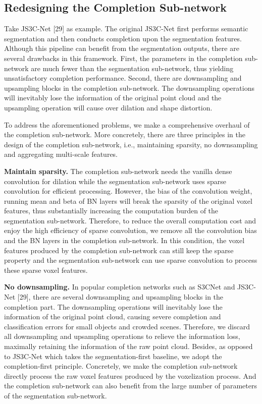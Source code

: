 \documentclass[10pt,twocolumn,letterpaper]{article}
\begin{document}
\subsection{Redesigning the Completion Sub-network}

Take JS3C-Net [29] as example. The original JS3C-Net first performs semantic segmentation and then conducts completion upon the segmentation features. Although this pipeline can benefit from the segmentation outputs, there are several drawbacks in this framework. First, the parameters in the completion sub-network are much fewer than the segmentation sub-network, thus yielding unsatisfactory completion performance. Second, there are downsampling and upsampling blocks in the completion sub-network. The downsampling operations will inevitably lose the information of the original point cloud and the upsampling operation will cause over dilation and shape distortion.

To address the aforementioned problems, we make a comprehensive overhaul of the completion sub-network. More concretely, there are three principles in the design of the completion sub-network, i.e., maintaining sparsity, no downsampling and aggregating multi-scale features.

\textbf{Maintain sparsity.}
The completion sub-network needs the vanilla dense convolution for dilation while the segmentation sub-network uses sparse convolution for efficient processing. However, the bias of the convolution weight, running mean and beta of BN layers will break the sparsity of the original voxel features, thus substantially increasing the computation burden of the segmentation sub-network. Therefore, to reduce the overall computation cost and enjoy the high efficiency of sparse convolution, we remove all the convolution bias and the BN layers in the completion sub-network. In this condition, the voxel features produced by the completion sub-network can still keep the sparse property and the segmentation sub-network can use sparse convolution to process these sparse voxel features.

\textbf{No downsampling.}
In popular completion networks such as S3CNet \cite{diederikpkingma2015} and JS3C-Net [29], there are several downsampling and upsampling blocks in the completion part. The downsampling operations will inevitably lose the information of the original point cloud, causing severe completion and classification errors for small objects and crowded scenes. Therefore, we discard all downsampling and upsampling operations to relieve the information loss, maximally retaining the information of the raw point cloud. Besides, as opposed to JS3C-Net which takes the segmentation-first baseline, we adopt the completion-first principle. Concretely, we make the completion sub-network directly process the raw voxel features produced by the voxelization process. And the completion sub-network can also benefit from the large number of parameters of the segmentation sub-network.
\end{document}
